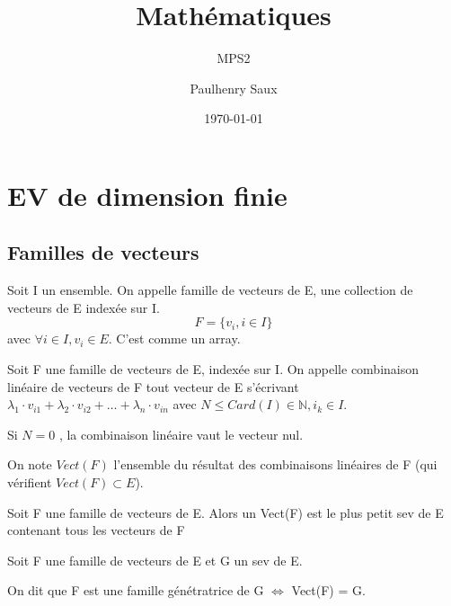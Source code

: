\documentclass[french]{yLectureNote}
\title{Mathématiques}
\subtitle{MPS2}
\author{Paulhenry Saux}
\date{\today}
\newcommand{\N}[0]{\mathbb{N}}
\newcommand{\R}[0]{\mathbb{R}}
\begin{document}
\setcounter{chapter}{3}
	\chapter{EV de dimension finie}
\section{Familles de vecteurs}
\begin{definition}
Soit I un ensemble. On appelle famille de vecteurs de E, une collection de vecteurs de E indexée sur I.
\[F = \{v_i,i\in I\}\] avec \(\forall i\in I, v_i \in E\). C'est comme un array.
\end{definition}
%
%

\begin{definition}
Soit F une famille de vecteurs de E, indexée sur I. On appelle combinaison linéaire de vecteurs de F tout vecteur de E s'écrivant \(\lambda_1\cdot v_{i1}+\lambda_2\cdot v_{i2}+\dots+\lambda_n\cdot v_{in}\) avec \(N\leq Card(I)\in \N, i_k\in I\).

Si \(N=0\) , la combinaison linéaire vaut le vecteur nul.
\end{definition}
On note \(Vect(F)\) l'ensemble du résultat des combinaisons linéaires de F (qui vérifient \(Vect(F)\subset E\)).
\begin{proposition}
Soit F une famille de vecteurs de E. Alors un Vect(F) est le plus petit sev de E contenant tous les vecteurs de F
\end{proposition}
%

\begin{definition}
Soit F une famille de vecteurs de E et G un sev de E.

On dit que F est une famille génétratrice de G \(\iff\) Vect(F) = G.
\end{definition}
\end{document}
